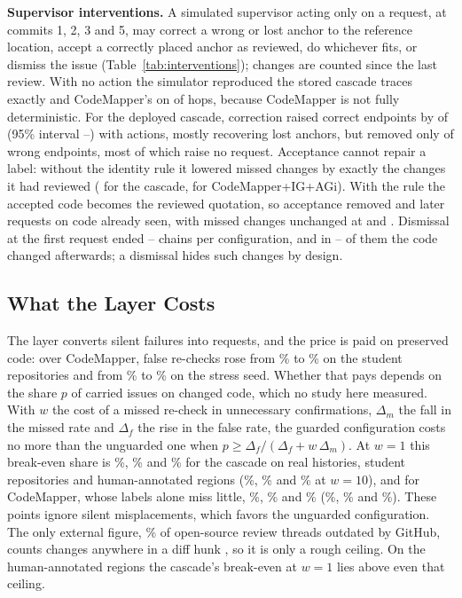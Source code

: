 \textbf{Supervisor interventions.}\label{sec:interventions} A simulated supervisor acting only on a request, at commits 1, 2, 3 and 5, may correct a wrong or lost anchor to the reference location, accept a correctly placed  anchor as reviewed, do whichever fits, or dismiss the issue (Table~\ref{tab:interventions}); changes are counted since the last review. With no action the simulator reproduced the stored cascade traces exactly and CodeMapper's on \wvGateCmAgree{} of \wvGateCmHops{} hops, because CodeMapper is not fully deterministic. For the deployed cascade, correction raised correct endpoints by \wvDepDPOneCorrectAbs{} of \wvChains{} (95\% interval \wvDepDPOneCorrectAbsLo--\wvDepDPOneCorrectAbsHi) with \wvDepPOneAct{} actions, mostly recovering lost anchors, but removed only \wvDepDPOneWrongAbs{} of \wvDepPZeroWrong{} wrong endpoints, most of which raise no request. Acceptance cannot repair a label: without the identity rule it lowered missed changes by exactly the changes it had reviewed (\wvDepDPTwoMissAbs{} for the cascade, \wvCmDPTwoMissAbs{} for CodeMapper+IG+AGi). With the rule the accepted code becomes the reviewed quotation, so acceptance removed \wvDepIdDPTwoReqAbs{} and \wvCmIdDPTwoReqAbs{} later requests on code already seen, with missed changes unchanged at \wvDepIdPTwoMiss{} and \wvCmIdPTwoMiss. Dismissal at the first request ended \wvDismissedMin--\wvDismissedMax{} chains per configuration, and in \wvDismissedChangedMin--\wvDismissedChangedMax{} of them the code changed afterwards; a dismissal hides such changes by design.

\subsection{What the Layer Costs}\label{sec:costs}
The layer converts silent failures into requests, and the price is paid on preserved code: over CodeMapper, false re-checks rose from \wiStuCmQFalse\% to \wiStuCmGiFalse\% on the student repositories and from \wiFrCmQFalse\% to \wiFrCmGiFalse\% on the stress seed. Whether that pays depends on the share $p$ of carried issues on changed code, which no study here measured. With $w$ the cost of a missed re-check in unnecessary confirmations, $\Delta_m$ the fall in the missed rate and $\Delta_f$ the rise in the false rate, the guarded configuration costs no more than the unguarded one when $p \ge \Delta_f/(\Delta_f + w\,\Delta_m)$. At $w=1$ this break-even share is \wiRealBreakEvenOne\%, \wiStuBreakEvenOne\% and \wiHumBreakEvenOne\% for the cascade on real histories, student repositories and human-annotated regions (\wiRealBreakEvenTen\%, \wiStuBreakEvenTen\% and \wiHumBreakEvenTen\% at $w=10$), and for CodeMapper, whose labels alone miss little, \wiRealCmBreakEvenOne\%, \wiStuCmBreakEvenOne\% and \wiHumCmBreakEvenOne\% (\wiRealCmBreakEvenTen\%, \wiStuCmBreakEvenTen\% and \wiHumCmBreakEvenTen\%). These points ignore silent misplacements, which favors the unguarded configuration. The only external figure, \wpeOutdatedPct\% of open-source review threads outdated by GitHub, counts changes anywhere in a diff hunk \cite{github2018outdating}, so it is only a rough ceiling. On the human-annotated regions the cascade's break-even at $w=1$ lies above even that ceiling.

